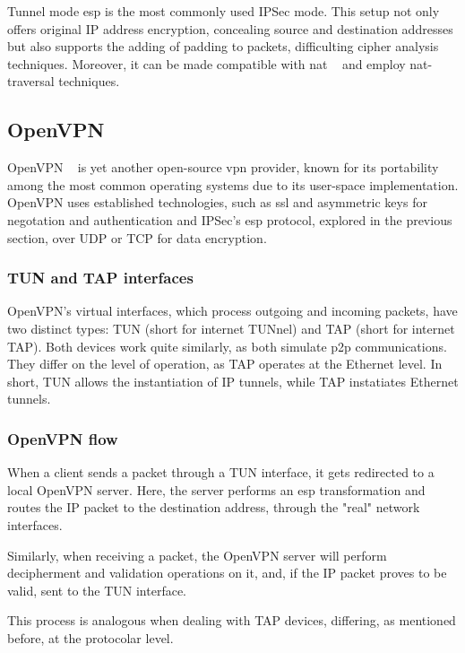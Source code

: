 \documentclass[11pt,twoside,a4paper]{report}
\begin{document}
Tunnel mode \acrshort{esp} is the most commonly used IPSec mode. This setup not only offers original IP address encryption, concealing source and destination addresses but also supports the adding of padding to packets, difficulting cipher analysis techniques. Moreover, it can be made compatible with \acrshort{nat} ~\cite{} and employ \acrshort{nat}-traversal techniques.

\subsection{OpenVPN}

OpenVPN ~\cite{ovpnwebsite} is yet another open-source \acrshort{vpn} provider, known for its portability among the most common operating systems due to its user-space implementation. OpenVPN uses established technologies, such as \acrshort{ssl} and asymmetric keys for negotation and authentication and IPSec's \acrshort{esp} protocol, explored in the previous section, over UDP or TCP for data encryption.

\subsubsection{TUN and TAP interfaces}

OpenVPN's virtual interfaces, which process outgoing and incoming packets, have two distinct types: TUN (short for internet TUNnel) and TAP (short for internet TAP). Both devices work quite similarly, as both simulate \acrshort{p2p} communications. They differ on the level of operation, as TAP operates at the Ethernet level. In short, TUN allows the instantiation of IP tunnels, while TAP instatiates Ethernet tunnels.

\subsubsection{OpenVPN flow}

When a client sends a packet through a TUN interface, it gets redirected to a local OpenVPN server. Here, the server performs an \acrshort{esp} transformation and routes the IP packet to the destination address, through the "real" network interfaces.

Similarly, when receiving a packet, the OpenVPN server will perform decipherment and validation operations on it, and, if the IP packet proves to be valid, sent to the TUN interface.

This process is analogous when dealing with TAP devices, differing, as mentioned before, at the protocolar level.
\end{document}
